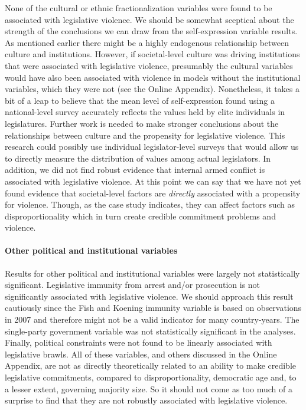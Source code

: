 \documentclass[a4paper]{article}\usepackage[]{graphicx}\usepackage[]{color}
\begin{document}
None of the cultural or ethnic fractionalization variables were found to be associated with legislative violence. We should be somewhat sceptical about the strength of the conclusions we can draw from the self-expression variable results. As mentioned earlier there might be a highly endogenous relationship between culture and institutions. However, if societal-level culture was driving institutions that were associated with legislative violence, presumably the cultural variables would have also been associated with violence in models without the institutional variables, which they were not (see the Online Appendix). Nonetheless, it takes a bit of a leap to believe that the mean level of self-expression found using a national-level survey accurately reflects the values held by elite individuals in legislatures. Further work is needed to make stronger conclusions about the relationships between culture and the propensity for legislative violence. This research could possibly use individual legislator-level surveys that would allow us to directly measure the distribution of values among actual legislators. In addition, we did not find robust evidence that internal armed conflict is associated with legislative violence. At this point we can say that we have not yet found evidence that societal-level factors are \emph{directly} associated with a propensity for violence. Though, as the case study indicates, they can affect factors such as disproportionality which in turn create credible commitment problems and violence.

\paragraph{Other political and institutional variables}

Results for other political and institutional variables were largely not statistically significant. Legislative immunity from arrest and/or prosecution is not significantly associated with legislative violence. We should approach this result cautiously since the Fish and Koening immunity variable is based on observations in 2007 and therefore might not be a valid indicator for many country-years. The single-party government variable was not statistically significant in the analyses. Finally, political constraints were not found to be linearly associated with legislative brawls. All of these variables, and others discussed in the Online Appendix, are not as directly theoretically related to an ability to make credible legislative commitments, compared to disproportionality, democratic age and, to a lesser extent, governing majority size. So it should not come as too much of a surprise to find that they are not robustly associated with legislative violence.
\end{document}
